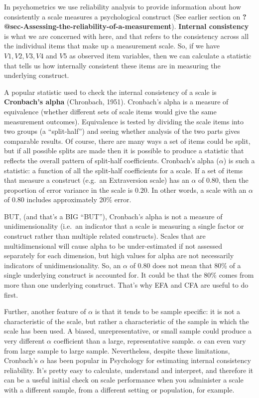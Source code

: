 \documentclass[
  a4paper,
]{book}
\begin{document}
In psychometrics we use reliability analysis to provide information
about how consistently a scale measures a psychological construct (See
earlier section on
\textbf{?@sec-Assessing-the-reliability-of-a-measurement}).
\textbf{Internal consistency} is what we are concerned with here, and
that refers to the consistency across all the individual items that make
up a measurement scale. So, if we have \(V1, V2, V3, V4\) and \(V5\) as
observed item variables, then we can calculate a statistic that tells us
how internally consistent these items are in measuring the underlying
construct.

A popular statistic used to check the internal consistency of a scale is
\textbf{Cronbach's alpha} (Chronbach, 1951). Cronbach's alpha is a
measure of equivalence (whether different sets of scale items would give
the same measurement outcomes). Equivalence is tested by dividing the
scale items into two groups (a ``split-half'') and seeing whether
analysis of the two parts gives comparable results. Of course, there are
many ways a set of items could be split, but if all possible splits are
made then it is possible to produce a statistic that reflects the
overall pattern of split-half coefficients. Cronbach's alpha
(\(\alpha\)) is such a statistic: a function of all the split-half
coefficients for a scale. If a set of items that measure a construct
(e.g.~an Extraversion scale) has an \(\alpha\) of \(0.80\), then the
proportion of error variance in the scale is \(0.20\). In other words, a
scale with an \(\alpha\) of \(0.80\) includes approximately 20\% error.

BUT, (and that's a BIG ``BUT''), Cronbach's alpha is not a measure of
unidimensionality (i.e.~an indicator that a scale is measuring a single
factor or construct rather than multiple related constructs). Scales
that are multidimensional will cause alpha to be under-estimated if not
assessed separately for each dimension, but high values for alpha are
not necessarily indicators of unidimensionality. So, an \(\alpha\) of
0.80 does not mean that 80\% of a single underlying construct is
accounted for. It could be that the 80\% comes from more than one
underlying construct. That's why EFA and CFA are useful to do first.

Further, another feature of \(\alpha\) is that it tends to be sample
specific: it is not a characteristic of the scale, but rather a
characteristic of the sample in which the scale has been used. A biased,
unrepresentative, or small sample could produce a very different
\(\alpha\) coefficient than a large, representative sample. \(\alpha\)
can even vary from large sample to large sample. Nevertheless, despite
these limitations, Cronbach's \(\alpha\) has been popular in Psychology
for estimating internal consistency reliability. It's pretty easy to
calculate, understand and interpret, and therefore it can be a useful
initial check on scale performance when you administer a scale with a
different sample, from a different setting or population, for example.
\end{document}
